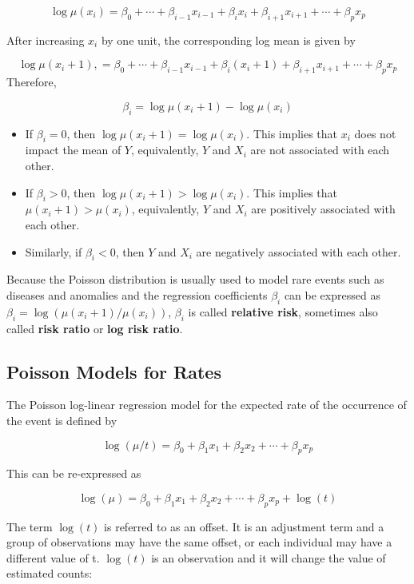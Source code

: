\documentclass[
]{book}
\begin{document}
\[
\log \mu(x_i) =  \beta_0 + \cdots + \beta_{i-1} x_{i-1}+ \beta_{i} x_{i} + \beta_{i+1} x_{i+1} + \cdots + \beta_p x_p
\]

After increasing \(x_i\) by one unit, the corresponding log mean is given by

\[
\log \mu(x_i+1), = \beta_0 + \cdots + \beta_{i-1} x_{i-1}+ \beta_{i} (x_{i}+1) + \beta_{i+1} x_{i+1} + \cdots + \beta_p x_p
\] Therefore,

\[
\beta_i = \log\mu(x_i+1)  - \log\mu(x_i)
\]

\begin{itemize}
\item
  If \(\beta_i = 0\), then \(\log\mu(x_i+1) = \log\mu(x_i)\). This implies that \(x_i\) does not impact the mean of \(Y\), equivalently, \(Y\) and \(X_i\) are not associated with each other.
\item
  If \(\beta_i > 0\), then \(\log\mu(x_i+1) > \log\mu(x_i)\). This implies that \(\mu(x_i+1) > \mu(x_i)\), equivalently, \(Y\) and \(X_i\) are positively associated with each other.
\item
  Similarly, if \(\beta_i < 0\), then \(Y\) and \(X_i\) are negatively associated with each other.
\end{itemize}

Because the Poisson distribution is usually used to model rare events such as diseases and anomalies and the regression coefficients \(\beta_i\) can be expressed as \(\beta_i = \log (\mu(x_i+1)/\mu(x_i))\), \(\beta_i\) is called \textbf{relative risk}, sometimes also called \textbf{risk ratio} or \textbf{log risk ratio}.

\hypertarget{poisson-models-for-rates}{%
\subsection{Poisson Models for Rates}\label{poisson-models-for-rates}}

The Poisson log-linear regression model for the expected rate of the occurrence of the event is defined by

\[
\log(\mu/t) = \beta_0 + \beta_1 x_1 + \beta_2 x_2 + \cdots + \beta_p x_p
\]

This can be re-expressed as

\[
\log(\mu)=\beta_0 + \beta_1 x_1 + \beta_2 x_2 + \cdots + \beta_p x_p+\log(t)
\]

The term \(\log(t)\) is referred to as an offset. It is an adjustment term and a group of observations may have the same offset, or each individual may have a different value of t. \(\log(t)\) is an observation and it will change the value of estimated counts:
\end{document}
